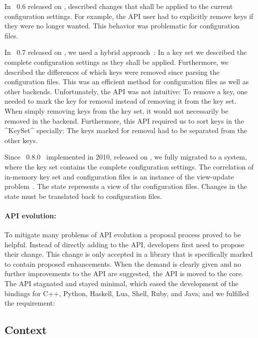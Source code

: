 In \elektra{}~0.6 released on , \elektra{} described changes that shall be applied to the current configuration settings.
For example, the API user had to explicitly remove keys if they were no longer wanted.
This behavior was problematic for configuration files.

In \elektra{}~0.7 released on , we used a hybrid approach~\cite{raab2010thesis}:
In a key set we described the complete configuration settings as they shall be applied.
Furthermore, we described the differences of which keys were removed since parsing the configuration files.
This was an efficient method for configuration files as well as other backends.
Unfortunately, the API was not intuitive:
To remove a key, one needed to mark the key for removal instead of removing it from the key set.
When simply removing keys from the key set, it would not necessarily be removed in the backend.
Furthermore, this API required us to sort keys in the ^KeySet^ specially:
The keys marked for removal had to be separated from the other keys.

Since \elektra{}~0.8.0~\cite{raab2010thesis} implemented in 2010, released on , we fully migrated to a system, where the key set contains the complete configuration settings.
The correlation of in-memory key set and configuration files  is an instance of the view-update problem~\cite{foster2010bidirectional}.
The state represents a view of the configuration files.
Changes in the state must be translated back to configuration files.

\paragraph{API evolution:}
To mitigate many problems of API evolution a proposal process proved to be  helpful.
Instead of directly adding to the API, developers first need to propose their change.
This change is only accepted in a library that is specifically marked to contain proposed enhancements.
When the demand is clearly given and no further improvements to the API are suggested, the API is moved to the core.
\newcommand{\supportedbindings}{C++, Python, Haskell, Lua, Shell, Ruby, and Java}
The API stagnated and stayed minimal, which eased the development of the bindings for \supportedbindings; and we fulfilled the requirement:
\reqMinimal*


\subsection{Context}
\label{sec:frontend-history-context}

